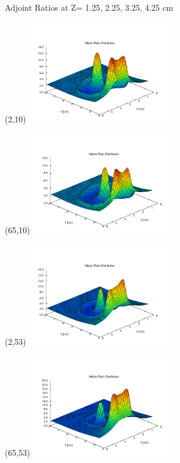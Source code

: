 \documentclass{beamer}
\begin{document}
\begin{frame}{Adjoint Ratios at Z= 1.25, 2.25, 3.25, 4.25 cm}

  \begin{textblock}{20}(2,10)
    \includegraphics[width=2.5in]{figures/adjoint_ratio-slice3.pdf}
  \end{textblock}

  \begin{textblock}{20}(65,10)
    \includegraphics[width=2.5in]{figures/adjoint_ratio-slice5.pdf}
  \end{textblock}

  \begin{textblock}{20}(2,53)
    \includegraphics[width=2.5in]{figures/adjoint_ratio-slice7.pdf}
  \end{textblock}

  \begin{textblock}{20}(65,53)
    \includegraphics[width=2.5in]{figures/adjoint_ratio-slice9.pdf}
  \end{textblock}

\end{frame}
\end{document}
